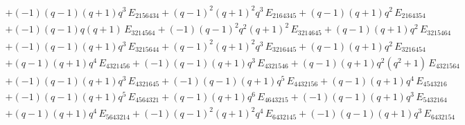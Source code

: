 \begin{multline*}
  \\
  + (-1) (q-1) (q+1) q^3\, E_{2156434} + (q-1)^{2} (q+1)^{2} q^3\, E_{2164345} + (q-1) (q+1) q^2\, E_{2164354}
  \\
  + (-1) (q-1) q (q+1)\, E_{3214564} + (-1) (q-1)^{2} q^2 (q+1)^{2}\, E_{3214645} + (q-1) (q+1) q^2\, E_{3215464}
  \\
  + (-1) (q-1) (q+1) q^3\, E_{3215644} + (q-1)^{2} (q+1)^{2} q^3\, E_{3216445} + (q-1) (q+1) q^2\, E_{3216454}
  \\
  + (q-1) (q+1) q^4\, E_{4321456} + (-1) (q-1) (q+1) q^3\, E_{4321546} + (q-1) (q+1) q^2 (q^2+1)\, E_{4321564}
  \\
  + (-1) (q-1) (q+1) q^3\, E_{4321645} + (-1) (q-1) (q+1) q^5\, E_{4432156} + (q-1) (q+1) q^4\, E_{4543216}
  \\
  + (-1) (q-1) (q+1) q^5\, E_{4564321} + (q-1) (q+1) q^6\, E_{4643215} + (-1) (q-1) (q+1) q^3\, E_{5432164}
  \\
  + (q-1) (q+1) q^4\, E_{5643214} + (-1) (q-1)^{2} (q+1)^{2} q^4\, E_{6432145} + (-1) (q-1) (q+1) q^3\, E_{6432154}
\end{multline*}

